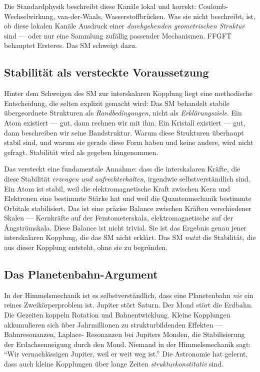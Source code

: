 Die Standardphysik beschreibt diese Kanäle lokal und korrekt:
Coulomb-Wechselwirkung, van-der-Waals, Wasserstoffbrücken. Was sie
nicht beschreibt, ist, ob diese lokalen Kanäle Ausdruck einer
\emph{durchgehenden geometrischen Struktur} sind --- oder nur eine
Sammlung zufällig passender Mechanismen. FFGFT behauptet Ersteres.
Das SM schweigt dazu.

\subsection*{Stabilität als versteckte Voraussetzung}

Hinter dem Schweigen des SM zur interskalaren Kopplung liegt eine
methodische Entscheidung, die selten explizit gemacht wird: Das SM
behandelt stabile übergeordnete Strukturen als \emph{Randbedingungen},
nicht als \emph{Erklärungsziele}. Ein Atom existiert --- gut, dann
rechnen wir mit ihm. Ein Kristall existiert --- gut, dann beschreiben
wir seine Bandstruktur. Warum diese Strukturen überhaupt stabil sind,
und warum sie gerade diese Form haben und keine andere, wird nicht
gefragt. Stabilität wird als gegeben hingenommen.

Das versteckt eine fundamentale Annahme: dass die interskalaren Kräfte,
die diese Stabilität \emph{erzeugen und aufrechterhalten}, irgendwie
selbstverständlich sind. Ein Atom ist stabil, weil die
elektromagnetische Kraft zwischen Kern und Elektronen eine bestimmte
Stärke hat und weil die Quantenmechanik bestimmte Orbitale
stabilisiert. Das ist eine präzise Balance zwischen Kräften
verschiedener Skalen --- Kernkräfte auf der Femtometerskala,
elektromagnetische auf der Ångströmskala. Diese Balance ist nicht
trivial. Sie ist das Ergebnis genau jener interskalaren Kopplung, die
das SM nicht erklärt. Das SM \emph{nutzt} die Stabilität, die aus
dieser Kopplung entsteht, ohne sie zu begründen.

\subsection*{Das Planetenbahn-Argument}

In der Himmelsmechanik ist es selbstverständlich, dass eine
Planetenbahn \emph{nie} ein reines Zweikörperproblem ist. Jupiter
stört Saturn. Der Mond stört die Erdbahn. Die Gezeiten koppeln
Rotation und Bahnentwicklung. Kleine Kopplungen akkumulieren sich über
Jahrmillionen zu strukturbildenden Effekten --- Bahnresonanzen, Laplace-
Resonanzen bei Jupiters Monden, die Stabilisierung der Erdachsenneigung
durch den Mond. Niemand in der Himmelsmechanik sagt: ``Wir
vernachlässigen Jupiter, weil er weit weg ist.'' Die Astronomie hat
gelernt, dass auch kleine Kopplungen über lange Zeiten
\emph{strukturkonstitutiv} sind.

